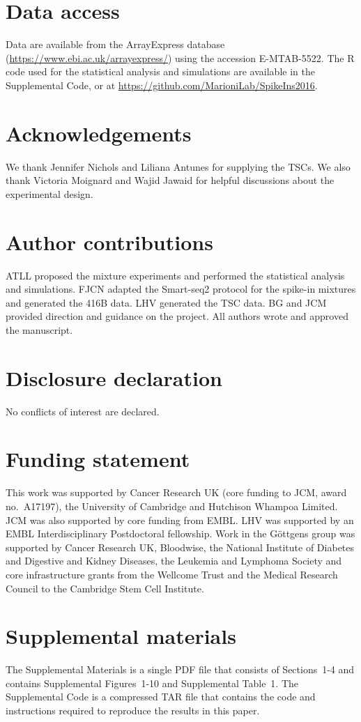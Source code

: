 \documentclass{article}
\newcommand{\suppfigindex}{10}
\newcommand{\suppsecsim}{4}
\begin{document}
\section*{Data access}
Data are available from the ArrayExpress database (\url{https://www.ebi.ac.uk/arrayexpress/}) using the accession E-MTAB-5522.
The R code used for the statistical analysis and simulations are available in the Supplemental Code, or at \url{https://github.com/MarioniLab/SpikeIns2016}.

\section*{Acknowledgements}
We thank Jennifer Nichols and Liliana Antunes for supplying the TSCs.
We also thank Victoria Moignard and Wajid Jawaid for helpful discussions about the experimental design.

\section*{Author contributions}
ATLL proposed the mixture experiments and performed the statistical analysis and simulations.
FJCN adapted the Smart-seq2 protocol for the spike-in mixtures and generated the 416B data.
LHV generated the TSC data.
BG and JCM provided direction and guidance on the project.
All authors wrote and approved the manuscript.

\section*{Disclosure declaration}
No conflicts of interest are declared.

\section*{Funding statement}
This work was supported by Cancer Research UK (core funding to JCM, award no.\ A17197), the University of Cambridge and Hutchison Whampoa Limited.
JCM was also supported by core funding from EMBL.
LHV was supported by an EMBL Interdisciplinary Postdoctoral fellowship.
Work in the G\"ottgens group was supported by Cancer Research UK, Bloodwise, the National Institute of Diabetes and Digestive and Kidney Diseases, the Leukemia and Lymphoma Society and core infrastructure grants from the Wellcome Trust and the Medical Research Council to the Cambridge Stem Cell Institute.

\section*{Supplemental materials}
The Supplemental Materials is a single PDF file that consists of Sections~1-\suppsecsim{} and contains Supplemental Figures~1-\suppfigindex{} and Supplemental Table~1.
The Supplemental Code is a compressed TAR file that contains the code and instructions required to reproduce the results in this paper.

\printbibliography
\end{document}
